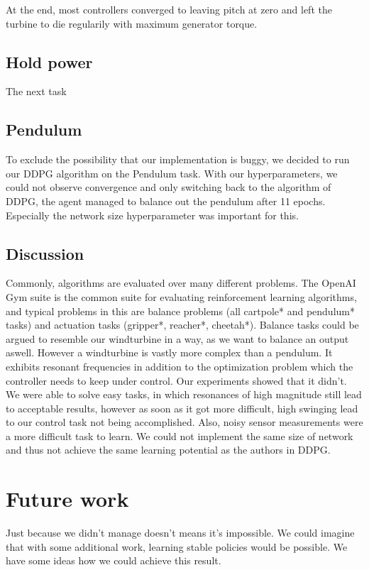 \documentclass[hyperref,beleg]{cgvpub}
\begin{document}
At the end, most controllers converged to leaving pitch at zero and left the turbine to die regularily with maximum generator torque.

\section{Hold power}
The next task

\section{Pendulum}
To exclude the possibility that our implementation is buggy, we decided to run our DDPG algorithm on the Pendulum task. With our hyperparameters, we could not observe convergence and only switching back to the algorithm of \ac{DDPG}, the agent managed to balance out the pendulum after 11 epochs. Especially the network size hyperparameter was important for this.


\section{Discussion}

Commonly, algorithms are evaluated over many different problems. The OpenAI Gym suite is the common suite for evaluating reinforcement learning algorithms, and typical problems in this are balance problems (all cartpole* and pendulum* tasks) and actuation tasks (gripper*, reacher*, cheetah*). Balance tasks could be argued to resemble our windturbine in a way, as we want to balance an output aswell. However a windturbine is vastly more complex than a pendulum. It exhibits resonant frequencies in addition to the optimization problem which the controller needs to keep under control. Our experiments showed that it didn't. We were able to solve easy tasks, in which resonances of high magnitude still lead to acceptable results, however as soon as it got more difficult, high swinging lead to our control task not being accomplished. Also, noisy sensor measurements were a more difficult task to learn. We could not implement the same size of network and thus not achieve the same learning potential as the authors in \ac{DDPG}.


\chapter{Future work}

Just because we didn't manage doesn't means it's impossible. We could imagine that with some additional work, learning stable policies would be possible. We have some ideas how we could achieve this result.
\end{document}
